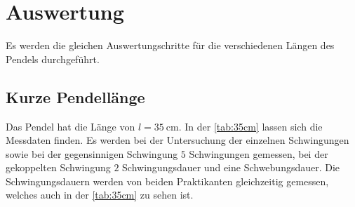 \section{Auswertung}
\label{sec:Auswertung}

Es werden die gleichen Auswertungschritte für die verschiedenen Längen des Pendels durchgeführt. 
 
\subsection{Kurze Pendellänge}

  Das Pendel hat die Länge von $l = \SI{35}{\centi\metre}$. In der \autoref{tab:35cm} lassen sich die Messdaten finden. Es werden bei der Untersuchung der einzelnen
  Schwingungen sowie bei der gegensinnigen Schwingung $\num{5}$ Schwingungen gemessen, bei der gekoppelten Schwingung $\num{2}$ Schwingungsdauer und eine 
  Schwebungsdauer. Die Schwingungsdauern werden von beiden Praktikanten gleichzeitig gemessen, welches auch in der \autoref{tab:35cm} zu sehen ist. 

